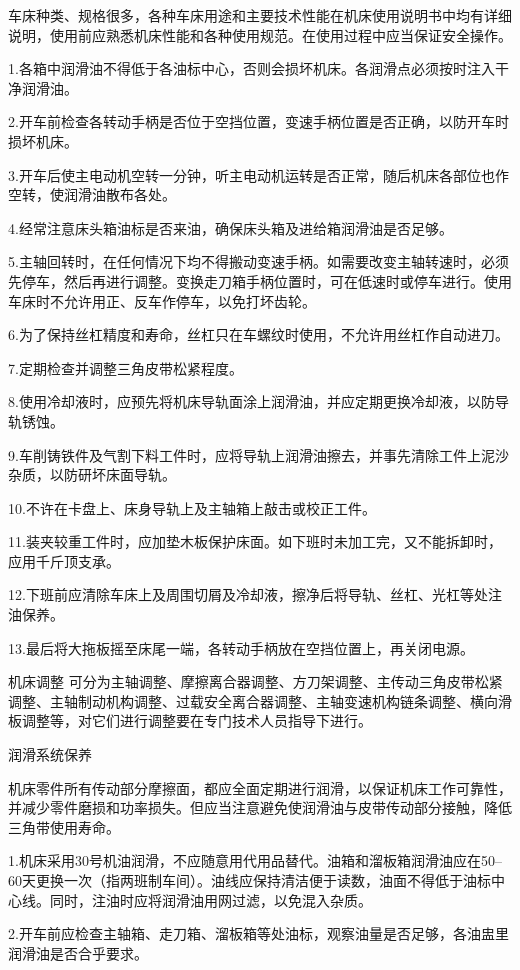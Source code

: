 \documentclass{ctexbook}
\begin{document}
车床种类、规格很多，各种车床用途和主要技术性能在机床使用说明书中均有详细说明，使用前应熟悉机床性能和各种使用规范。在使用过程中应当保证安全操作。

1.各箱中润滑油不得低于各油标中心，否则会损坏机床。各润滑点必须按时注入干净润滑油。

2.开车前检查各转动手柄是否位于空挡位置，变速手柄位置是否正确，以防开车时损坏机床。

3.开车后使主电动机空转一分钟，听主电动机运转是否正常，随后机床各部位也作空转，使润滑油散布各处。

4.经常注意床头箱油标是否来油，确保床头箱及进给箱润滑油是否足够。

5.主轴回转时，在任何情况下均不得搬动变速手柄。如需要改变主轴转速时，必须先停车，然后再进行调整。变换走刀箱手柄位置时，可在低速时或停车进行。使用车床时不允许用正、反车作停车，以免打坏齿轮。

6.为了保持丝杠精度和寿命，丝杠只在车螺纹时使用，不允许用丝杠作自动进刀。

7.定期检查并调整三角皮带松紧程度。

8.使用冷却液时，应预先将机床导轨面涂上润滑油，并应定期更换冷却液，以防导轨锈蚀。

9.车削铸铁件及气割下料工件时，应将导轨上润滑油擦去，并事先清除工件上泥沙杂质，以防研坏床面导轨。

10.不许在卡盘上、床身导轨上及主轴箱上敲击或校正工件。

11.装夹较重工件时，应加垫木板保护床面。如下班时未加工完，又不能拆卸时，应用千斤顶支承。

12.下班前应清除车床上及周围切屑及冷却液，擦净后将导轨、丝杠、光杠等处注油保养。

13.最后将大拖板摇至床尾一端，各转动手柄放在空挡位置上，再关闭电源。	

机床调整
可分为主轴调整、摩擦离合器调整、方刀架调整、主传动三角皮带松紧调整、主轴制动机构调整、过载安全离合器调整、主轴变速机构链条调整、横向滑板调整等，对它们进行调整要在专门技术人员指导下进行。

润滑系统保养

机床零件所有传动部分摩擦面，都应全面定期进行润滑，以保证机床工作可靠性，并减少零件磨损和功率损失。但应当注意避免使润滑油与皮带传动部分接触，降低三角带使用寿命。

1.机床采用30号机油润滑，不应随意用代用品替代。油箱和溜板箱润滑油应在50--60天更换一次（指两班制车间）。油线应保持清洁便于读数，油面不得低于油标中心线。同时，注油时应将润滑油用网过滤，以免混入杂质。

2.开车前应检查主轴箱、走刀箱、溜板箱等处油标，观察油量是否足够，各油盅里润滑油是否合乎要求。
\end{document}
